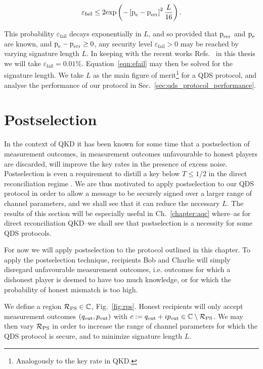 \begin{equation}\label{eqn:efail}
\varepsilon_{\text{fail}} \le 2 \text{exp}\left( - \left[\text{p}_{\text{e}} - \text{p}_{\text{err}}\right]^2 \frac{L}{16}\right).
\end{equation}

\noindent This probability $\varepsilon_{\text{fail}}$ decays exponentially in $L$, and so provided that $\text{p}_{\text{err}}$ and $\text{p}_{\text{e}}$ are known, and $\text{p}_{\text{e}} - \text{p}_{\text{err}} \ge 0$, any security level $\varepsilon_{\text{fail}} > 0 $ may be reached by varying signature length $L$. In keeping with the recent works Refs.~\cite{Collins2014, Croal2016, Donaldson2016, Amiri2016} in this thesis we will take $\varepsilon_{\text{fail}} = 0.01\%$. Equation~\ref{eqn:efail} may then be solved for the signature length. We take $L$ as the main figure of merit\footnote{Analogously to the key rate in QKD.} for a QDS protocol, and analyse the performance of our protocol in Sec.~\ref{sec:qds_protocol_performance}.



\section{Postselection}\label{sec:qds_postselection}
In the context of QKD it has been known for some time that a postselection of measurement outcomes, in measurement outcomes unfavourable to honest players are discarded, will improve the key rates in the presence of excess noise. Postselection is even a requirement to distill a key below $T \le 1/2$ in the direct reconciliation regime \cite{Silberhorn2002}. We are thus motivated to apply postselection to our QDS protocol in order to allow a message to be securely signed over a larger range of channel parameters, and we shall see that it can reduce the necessary $L$. The results of this section will be especially useful in Ch.~\ref{chapter:aqc} where--as for direct reconciliation QKD--we shall see that postselection is a necessity for some QDS protocols.

For now we will apply postselection to the protocol outlined in this chapter. To apply the postselection technique, recipients Bob and Charlie will simply disregard unfavourable measurement outcomes, i.e. outcomes for which a dishonest player is deemed to have too much knowledge, or for which the probability of honest mismatch is too high.

We define a region $\mathcal{R}_{\text{PS}} \in \mathbb{C}$, Fig.~\ref{fig:rps}. Honest recipients will only accept measurement outcomes $\left(q_{\text{out}}, p_{\text{out}}\right)$ with $c := q_{\text{out}} + i p_{\text{out}} \in \mathbb{C}\setminus\mathcal{R}_{\text{PS}}$. We may then vary $\mathcal{R}_{\text{PS}}$ in order to increase the range of channel parameters for which the QDS protocol is secure, and to minimize signature length $L$.

